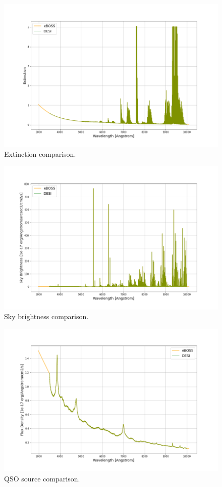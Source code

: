 \begin{figure}[h]
\centering
\includegraphics[width=12cm]{images/specsim/extinction.png}
\caption{Extinction comparison.}
\label{fig:extinction}
\end{figure}

\begin{figure}[h]
\centering
\includegraphics[width=12cm]{images/specsim/sky_brightness.png}
\caption{Sky brightness comparison.}
\label{fig:sky_brightness}
\end{figure}

\begin{figure}[h]
\centering
\includegraphics[width=12cm]{images/specsim/source.png}
\caption{QSO source comparison.}
\label{fig:qso_source}
\end{figure}

